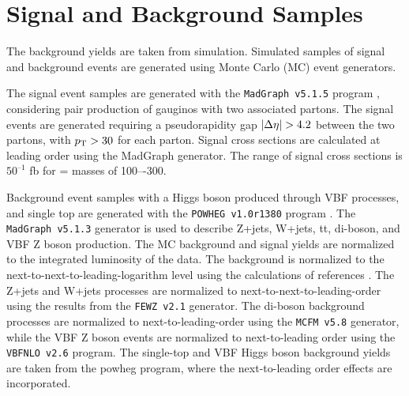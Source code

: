 
\clearpage



\section{Signal and Background Samples}




The background yields are taken from simulation. Simulated samples of signal and background events are generated using Monte Carlo (MC) event generators.

 The signal event samples are generated with the \texttt{MadGraph v5.1.5} program \cite{Alwall:2011uj}, considering pair production of gauginos with two associated partons. The signal events are generated requiring a pseudorapidity gap $|\Delta\eta| > 4.2$ between the two partons, with $p_{\text{T}} > 30$ \pt for each parton. Signal cross sections are calculated at leading order using the MadGraph generator. The range of signal cross sections is $50^{–1}$ fb for \charginopm = \neutralinotwo masses of 100–-300\gev.
 
 Background event samples with a Higgs boson produced through VBF processes, and single top are generated with the \texttt{POWHEG v1.0r1380} program \cite{Frixione:2007vw}. 
 The \texttt{MadGraph v5.1.3} generator is used to describe Z+jets, W+jets, tt, di-boson, and VBF Z boson production. The MC background and signal yields are normalized to the integrated luminosity of the data. 
 The \ttbar background is normalized to the next-to-next-to-leading-logarithm level using the calculations of references \cite{Czakon:2013goa,Melnikov:2006kv}. 
 The Z+jets and W+jets processes are normalized to next-to-next-to-leading-order using the results from the \texttt{FEWZ v2.1} \cite{Gavin:2010az} generator. 
 The di-boson background processes are normalized to next-to-leading-order using the \texttt{MCFM v5.8} \cite{Campbell:2010ff} generator, while the VBF Z boson events are normalized to next-to-leading order using the \texttt{VBFNLO v2.6} \cite{Arnold:2008rz,Arnold:2011wj}program. 
 The single-top and VBF Higgs boson background yields are taken from the powheg program, where the next-to-leading order effects are incorporated.
 
